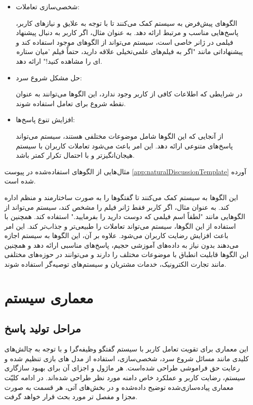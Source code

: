 \begin{itemize}
\item

شخصی‌سازی تعاملات:

الگوهای پیش‌فرض به سیستم کمک می‌کنند تا با توجه به علایق و نیازهای کاربر، پاسخ‌هایی مناسب و مرتبط ارائه دهد. به عنوان مثال، اگر کاربر به دنبال پیشنهاد فیلمی در ژانر خاصی است، سیستم می‌تواند از الگوهای موجود استفاده کند و پیشنهاداتی مانند "اگر به فیلم‌های علمی‌تخیلی علاقه دارید، حتماً فیلم 'میان ستاره ای را مشاهده کنید!" ارائه دهد.
\item

حل مشکل شروع سرد:

در شرایطی که اطلاعات کافی از کاربر وجود ندارد، این الگوها می‌توانند به عنوان نقطه شروع برای تعامل استفاده شوند. 

\item
افزایش تنوع پاسخ‌ها:

از آنجایی که این الگوها شامل موضوعات مختلفی هستند، سیستم می‌تواند پاسخ‌های متنوعی ارائه دهد. این امر باعث می‌شود تعاملات کاربران با سیستم هیجان‌انگیزتر و با احتمال تکرار کمتر باشد.
\end{itemize}
مثال‌هایی از الگوهای استفاده‌شده در پیوست %
\ref{app:naturalDiscussionTemplate}
 آورده شده است.


این الگوها به سیستم کمک می‌کنند تا گفتگوها را به صورت ساختارمند و منظم اداره کند. به عنوان مثال، اگر کاربر فقط ژانر فیلم را مشخص کند، سیستم می‌تواند از الگوهایی مانند "لطفاً اسم فیلمی که دوست دارید را بفرمایید." استفاده کند. همچنین با استفاده از این الگوها، سیستم می‌تواند تعاملات را طبیعی‌تر و جذاب‌تر کند. این امر باعث افزایش رضایت کاربران می‌شود. علاوه بر آن، این الگوها به سیستم اجازه می‌دهند بدون نیاز به داده‌های آموزشی حجیم، پاسخ‌های مناسبی ارائه دهد و همچنین این الگوها قابلیت انطباق با موضوعات مختلف را دارند و می‌توانند در حوزه‌های مختلفی مانند تجارت الکترونیک، خدمات مشتریان و سیستم‌های توصیه‌گر استفاده شوند.



\section{معماری سیستم}
\label{sec:architecture}
\subsection{مراحل تولید پاسخ}

این معماری برای تقویت تعامل کاربر با سیستم گفتگو وظیفه‌گرا و با  توجه به چالش‌های کلیدی مانند مسائل شروع سرد، شخصی‌سازی، استفاده از مدل های بازی تنظیم شده و رعایت حق فراموشی طراحی شده‌است. هر ماژول و اجزای آن برای بهبود سازگاری سیستم، رضایت کاربر و عملکرد خاص دامنه مورد نظر طراحی شده‌اند. در ادامه کلیّت معماری پیاده‌سازی‌شده توضیح داده‌شده و در بخش‌های آتی، هر قسمت به صورت مجزا و مفصل تر مورد بحث قرار خواهد گرفت.

